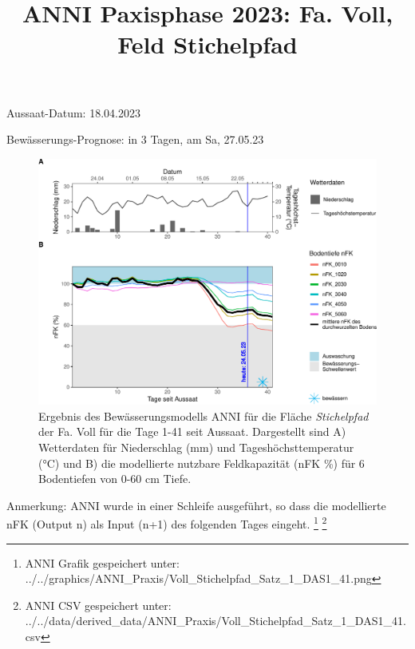 \documentclass[
]{article}
\title{ANNI Paxisphase 2023: Fa. Voll, Feld Stichelpfad}
\author{}
\date{\vspace{-2.5em}}
\begin{document}
\maketitle

Aussaat-Datum: 18.04.2023

Bewässerungs-Prognose: in 3 Tagen, am Sa, 27.05.23

\hfill\break

\begin{figure}[H]
\includegraphics{Fa_Voll_Feld_Stichelpfad_24_05_2023_files/figure-latex/unnamed-chunk-19-1} \caption{Ergebnis des Bewässerungsmodells ANNI für die Fläche \textit{Stichelpfad} der Fa. Voll für die Tage 1-41 seit Aussaat. Dargestellt sind A) Wetterdaten für Niederschlag (mm) und Tageshöchsttemperatur (°C) und B) die modellierte nutzbare Feldkapazität (nFK \%) für 6 Bodentiefen von 0-60 cm Tiefe.}\label{fig:unnamed-chunk-19}
\end{figure}

Anmerkung: ANNI wurde in einer Schleife ausgeführt, so dass die
modellierte nFK (Output n) als Input (n+1) des folgenden Tages eingeht.
\footnote{ANNI Grafik gespeichert unter:
  ../../graphics/ANNI\_Praxis/Voll\_Stichelpfad\_Satz\_1\_DAS1\_41.png}
\footnote{ANNI CSV gespeichert unter:
  ../../data/derived\_data/ANNI\_Praxis/Voll\_Stichelpfad\_Satz\_1\_DAS1\_41.csv}
\end{document}
